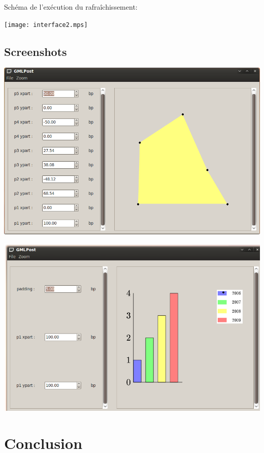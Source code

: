 \documentclass[a4paper,12pt]{article}
\begin{document}
\bigskip

Schéma de l'exécution du rafraîchissement:
\begin{center}
\texttt{[image: interface2.mps]}
\end{center}

\subsection{Screenshots}
\includegraphics[scale=0.5]{screen1.png}

\includegraphics[scale=0.5]{screen2.png}

\section{Conclusion}
\end{document}
